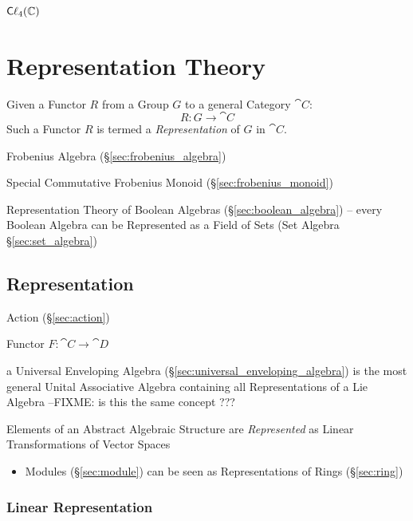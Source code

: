 {{$\mathsf{C}\ell_4(\mathbb{C})$



\section{Representation Theory}\label{sec:representation_theory}


Given a Functor $R$ from a Group $G$ to a general Category
$\cat{C}$:
\[
    R : G \rightarrow \cat{C}
\]
Such a Functor $R$ is termed a \emph{Representation} of $G$ in
$\cat{C}$.

Frobenius Algebra (\S\ref{sec:frobenius_algebra})

Special Commutative Frobenius Monoid (\S\ref{sec:frobenius_monoid})

Representation Theory of Boolean Algebras (\S\ref{sec:boolean_algebra}) -- every
Boolean Algebra can be Represented as a Field of Sets (Set Algebra
\S\ref{sec:set_algebra})



\subsection{Representation}\label{sec:representation}

Action (\S\ref{sec:action})

Functor $F : \cat{C} \rightarrow \cat{D}$

\fist a Universal Enveloping Algebra (\S\ref{sec:universal_enveloping_algebra})
is the most general Unital Associative Algebra containing all Representations
of a Lie Algebra
--FIXME: is this the same concept ???

Elements of an Abstract Algebraic Structure are \emph{Represented} as Linear
Transformations of Vector Spaces

\begin{itemize}
  \item Modules (\S\ref{sec:module}) can be seen as Representations of Rings
    (\S\ref{sec:ring})
\end{itemize}




\subsubsection{Linear Representation}\label{sec:linear_representation}

}}
